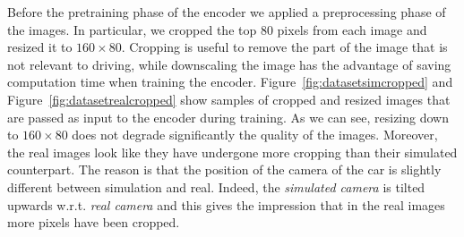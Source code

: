 
Before the pretraining phase of the encoder we applied a preprocessing phase of the images. In particular, we cropped the top 80 pixels from each image and resized it to $160 \times 80$. Cropping is useful to remove the part of the image that is not relevant to driving, while downscaling the image has the advantage of saving computation time when training the encoder. Figure~\ref{fig:datasetsimcropped} and Figure~\ref{fig:datasetrealcropped} show samples of cropped and resized images that are passed as input to the encoder during training. As we can see, resizing down to $160 \times 80$ does not degrade significantly the quality of the images. Moreover, the real images look like they have undergone more cropping than their simulated counterpart. The reason is that the position of the camera of the car is slightly different between simulation and real. Indeed, the \textit{simulated camera} is tilted upwards w.r.t. \textit{real camera} and this gives the impression that in the real images more pixels have been cropped.



